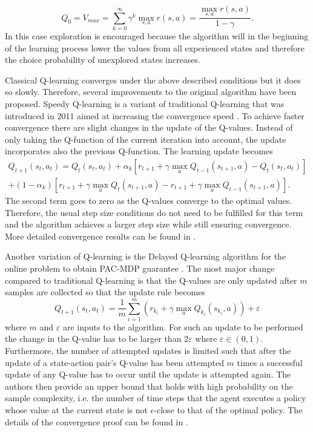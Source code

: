 \documentclass[../main.tex]{subfiles}
\begin{document}
\begin{equation}\label{eq:optimistic_init}
    Q_0 = V_{max} = \sum_{k=0}^\infty \gamma^k\max_{s,a}r(s,a) = \dfrac{\max_{s,a}{r(s,a)}}{1-\gamma}.
\end{equation}
In this case exploration is encouraged because the algorithm will in the beginning of the learning process lower the values from all experienced states and therefore the choice probability of unexplored states increases. \par
Classical Q-learning converges under the above described conditions but it does so slowly. Therefore, several improvements to the original algorithm have been proposed. Speedy Q-learning is a variant of traditional Q-learning that was introduced in 2011 aimed at increasing the convergence speed \cite{azar2011speedy}. To achieve faster convergence there are slight changes in the update of the Q-values. Instead of only taking the Q-function of the current iteration into account, the update incorporates also the previous Q-function. The learning update becomes
\begin{multline}
Q_{t+1}(s_t,a_t) = Q_{t}(s_t,a_t) + \alpha_k \left[ r_{t+1}+\gamma \max_a Q_{t-1}(s_{t+1},a) - Q_{t}(s_t,a_t)\right] \\+ (1-\alpha_k) \left[ r_{t+1}+\gamma \max_a Q_{t}(s_{t+1},a) -  r_{t+1}+\gamma \max_a Q_{t-1}(s_{t+1},a)\right].
\end{multline}
The second term goes to zero as the Q-values converge to the optimal values. Therefore, the usual step size conditions do not need to be fulfilled for this term and the algorithm achieves a larger step size while still ensuring convergence. More detailed convergence results can be found in \cite{azar2011speedy}.\par
Another variation of Q-learning is the Delayed Q-learning algorithm for the online problem to obtain PAC-MDP guarantee \cite{strehl2006pac}. The most major change compared to traditional Q-learning is that the Q-values are only updated after $m$ samples are collected so that the update rule becomes
\begin{equation}\label{DelayedQ}
Q_{t+1}(s_t,a_t) = \dfrac{1}{m} \sum_{i=1}^m \left( r_{k_i} + \gamma \max_{a} Q_{k_i}(s_{k_i},a) \right) + \varepsilon
\end{equation}
where $m$ and $\varepsilon$ are inputs to the algorithm.
For such an update to be performed the change in the Q-value has to be larger than $2\varepsilon$ where $\varepsilon \in (0,1)$. Furthermore, the number of attempted updates is limited such that after the update of a state-action pair's Q-value has been attempted $m$ times a successful update of any Q-value has to occur until the update is attempted again. The authors then provide an upper bound that holds with high probability on the sample complexity, i.e. the number of time steps that the agent executes a policy whose value at the current state is not $\epsilon$-close to that of the optimal policy. The details of the convergence proof can be found in \cite{strehl2006pac}.\par
\end{document}
